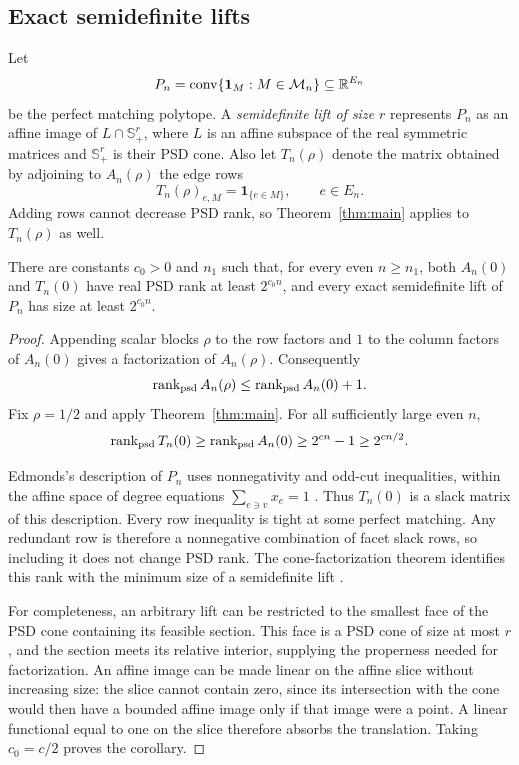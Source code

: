 \subsection{Exact semidefinite lifts}

Let
\[
 P_n=\operatorname{conv}\{\mathbf1_M:M\in\mathcal M_n\}
 \subseteq\mathbb R^{E_n}
\]
be the perfect matching polytope.  A \emph{semidefinite lift of
size $r$} represents $P_n$ as an affine image of
$L\cap\mathbb S_+^r$, where $L$ is an affine subspace of the real
symmetric matrices and $\mathbb S_+^r$ is their PSD cone.  Also let
$T_n(\rho)$ denote the matrix obtained by adjoining to $A_n(\rho)$
the edge rows
\[
 T_n(\rho)_{e,M}=\mathbf1_{\{e\in M\}},\qquad e\in E_n.
\]
Adding rows cannot decrease PSD rank, so
Theorem~\ref{thm:main} applies to $T_n(\rho)$ as well.

\begin{corollary}
\label{cor:exact-lift}
There are constants $c_0>0$ and $n_1$ such that, for every even
$n\ge n_1$, both $A_n(0)$ and $T_n(0)$ have real PSD rank at least
$2^{c_0n}$, and every exact semidefinite lift of $P_n$ has size at
least $2^{c_0n}$.
\end{corollary}
\begin{proof}
Appending scalar blocks $\rho$ to the row factors and $1$ to the
column factors of $A_n(0)$ gives a factorization of $A_n(\rho)$.
Consequently
\[
 \operatorname{rank_{psd}} A_n(\rho)\le\operatorname{rank_{psd}} A_n(0)+1.
\]
Fix $\rho=1/2$ and apply Theorem~\ref{thm:main}.  For all sufficiently
large even $n$,
\[
 \operatorname{rank_{psd}} T_n(0)\ge\operatorname{rank_{psd}} A_n(0)\ge2^{cn}-1\ge2^{cn/2}.
\]

Edmonds's description of $P_n$ uses nonnegativity and odd-cut
inequalities, within the affine space of degree equations
$\sum_{e\ni v}x_e=1$ \cite{edmonds}.  Thus $T_n(0)$ is a slack
matrix of this description.  Every row inequality is tight at some
perfect matching.  Any redundant row is therefore a nonnegative
combination of facet slack rows, so including it does not change
PSD rank.  The cone-factorization theorem identifies this rank with
the minimum size of a semidefinite lift
\cite[Theorem~2.4 and Corollary~2.6]{gpt}.

For completeness, an arbitrary lift can be restricted to the
smallest face of the PSD cone containing its feasible section.
This face is a PSD cone of size at most $r$, and the section meets
its relative interior, supplying the properness needed for
factorization.  An affine image can be made linear on the affine
slice without increasing size: the slice cannot contain zero,
since its intersection with the cone would then have a bounded
affine image only if that image were a point.  A linear functional
equal to one on the slice therefore absorbs the translation.
Taking $c_0=c/2$ proves the corollary.
\end{proof}

